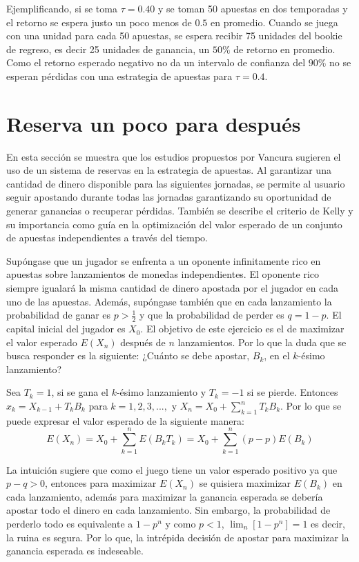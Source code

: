 Ejemplificando, si se toma $\tau = 0.40$ y se toman 50 apuestas en dos temporadas y el retorno se espera justo un poco menos de $0.5$ en promedio. Cuando se juega con una unidad para cada 50 apuestas, se espera recibir 75 unidades del bookie de regreso, es decir 25 unidades de ganancia, un $50\%$ de retorno en promedio. Como el retorno esperado negativo no da un intervalo de confianza del $90\%$ no se esperan pérdidas con una estrategia de apuestas para $\tau = 0.4$.

\section{Reserva un poco para después}
\label{sec:reserva}

En esta sección se muestra que los estudios propuestos por Vancura \cite{vancura2000finding} sugieren el uso de un sistema de reservas en la estrategia de apuestas. Al garantizar una cantidad de dinero disponible para las siguientes jornadas, se permite al usuario seguir apostando durante todas las jornadas garantizando su oportunidad de generar ganancias o recuperar pérdidas. También se describe el criterio de Kelly \cite{kelly1956new} y su importancia como guía en la optimización del valor esperado de un conjunto de apuestas independientes a través del tiempo.
	


Supóngase que un jugador se enfrenta a un oponente infinitamente rico en apuestas sobre lanzamientos de monedas independientes. El oponente rico siempre igualará la misma cantidad de dinero apostada por el jugador en cada uno de las apuestas. Además, supóngase también que en cada lanzamiento la probabilidad de ganar es $p>\frac{1}{2}$ y que la probabilidad de perder es $q = 1 - p$. El capital inicial del jugador es $X_0$. El objetivo de este ejercicio es el de maximizar el valor esperado $E(X_n)$ después de $n$ lanzamientos. Por lo que la duda que se busca responder es la siguiente: ¿Cuánto se debe apostar, $B_k$, en el $k$-ésimo lanzamiento?

Sea $T_k = 1$, si se gana el $k$-ésimo lanzamiento y $T_k = -1$ si se pierde. Entonces $x_k = X_{k-1} + T_k B_k$ para $k=1,2,3, ...,$ y $X_n = X_0 + \sum_{k=1}^{n}{T_k B_k}$. Por lo que se puede expresar el valor esperado de la siguiente manera:
\[E(X_n) = X_0 + \sum_{k=1}^{n}{E(B_k T_k)} = X_0 + \sum_{k=1}^{n}{(p-p)E(B_k)}\]
 
La intuición sugiere que como el juego tiene un valor esperado positivo ya que $p - q > 0$, entonces para maximizar $E(X_n)$ se quisiera maximizar $E(B_k)$ en cada lanzamiento, además para maximizar la ganancia esperada se debería apostar todo el dinero en cada lanzamiento. Sin embargo, la probabilidad de perderlo todo es equivalente a $1 - p^n$ y como $p < 1$, $\lim_n[1 - p^n] = 1$ es decir, la ruina es segura. Por lo que, la intrépida decisión de apostar para maximizar la ganancia esperada es indeseable.

